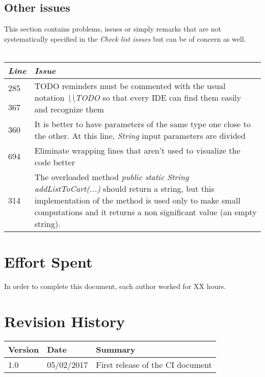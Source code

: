 \documentclass[11pt,a4paper]{report}
\begin{document}
\section{Other issues}
This section contains problems, issues or simply remarks that are not systematically specified in the \textit{Check list issues} but can be of concern as well.\\\\
\begin{tabularx}{\textwidth}{|l|X|}
	\hline
	\textit{Line} & \textit{Issue}\\
	\hline
	\hline
	285 & \multirow{2}{\linewidth}{TODO reminders must be commented with the usual notation \textit{\textbackslash\textbackslash TODO} so that every IDE can find them easily and recognize them}\\
	367 & \\
	\hline
	360 & It is better to have parameters of the same type one close to the other. At this line, \textit{String} input parameters are divided\\
	\hline
	694 & Eliminate wrapping lines that aren't used to visualize the code better\\
	\hline
	314 & The overloaded method \textit{public static String addListToCart(...)} should return a string, but this implementation of the method is used only to make small computations and it returns a non significant value (an empty string).\\
	\hline
\end{tabularx}
\chapter{Effort Spent}
In order to complete this document, each author worked for XX hours.
\chapter{Revision History}
\begin{tabularx}{\textwidth}{|l|l|X|}
	\hline
	Version & Date & Summary\\
	\hline
	\hline
	1.0 & 05/02/2017 & First release of the CI document\\
	\hline
\end{tabularx}
\end{document}
